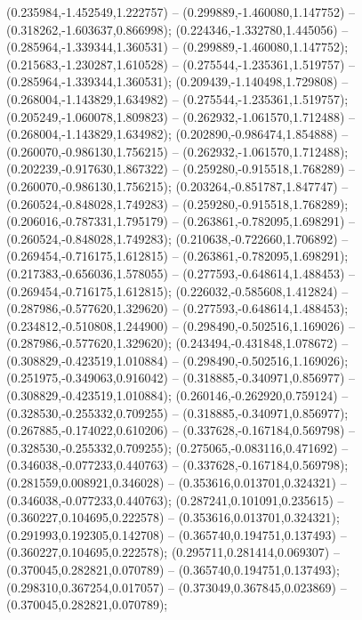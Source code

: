  (0.235984,-1.452549,1.222757) -- (0.299889,-1.460080,1.147752) -- (0.318262,-1.603637,0.866998);
 (0.224346,-1.332780,1.445056) -- (0.285964,-1.339344,1.360531) -- (0.299889,-1.460080,1.147752);
 (0.215683,-1.230287,1.610528) -- (0.275544,-1.235361,1.519757) -- (0.285964,-1.339344,1.360531);
 (0.209439,-1.140498,1.729808) -- (0.268004,-1.143829,1.634982) -- (0.275544,-1.235361,1.519757);
 (0.205249,-1.060078,1.809823) -- (0.262932,-1.061570,1.712488) -- (0.268004,-1.143829,1.634982);
 (0.202890,-0.986474,1.854888) -- (0.260070,-0.986130,1.756215) -- (0.262932,-1.061570,1.712488);
 (0.202239,-0.917630,1.867322) -- (0.259280,-0.915518,1.768289) -- (0.260070,-0.986130,1.756215);
 (0.203264,-0.851787,1.847747) -- (0.260524,-0.848028,1.749283) -- (0.259280,-0.915518,1.768289);
 (0.206016,-0.787331,1.795179) -- (0.263861,-0.782095,1.698291) -- (0.260524,-0.848028,1.749283);
 (0.210638,-0.722660,1.706892) -- (0.269454,-0.716175,1.612815) -- (0.263861,-0.782095,1.698291);
 (0.217383,-0.656036,1.578055) -- (0.277593,-0.648614,1.488453) -- (0.269454,-0.716175,1.612815);
 (0.226032,-0.585608,1.412824) -- (0.287986,-0.577620,1.329620) -- (0.277593,-0.648614,1.488453);
 (0.234812,-0.510808,1.244900) -- (0.298490,-0.502516,1.169026) -- (0.287986,-0.577620,1.329620);
 (0.243494,-0.431848,1.078672) -- (0.308829,-0.423519,1.010884) -- (0.298490,-0.502516,1.169026);
 (0.251975,-0.349063,0.916042) -- (0.318885,-0.340971,0.856977) -- (0.308829,-0.423519,1.010884);
 (0.260146,-0.262920,0.759124) -- (0.328530,-0.255332,0.709255) -- (0.318885,-0.340971,0.856977);
 (0.267885,-0.174022,0.610206) -- (0.337628,-0.167184,0.569798) -- (0.328530,-0.255332,0.709255);
 (0.275065,-0.083116,0.471692) -- (0.346038,-0.077233,0.440763) -- (0.337628,-0.167184,0.569798);
 (0.281559,0.008921,0.346028) -- (0.353616,0.013701,0.324321) -- (0.346038,-0.077233,0.440763);
 (0.287241,0.101091,0.235615) -- (0.360227,0.104695,0.222578) -- (0.353616,0.013701,0.324321);
 (0.291993,0.192305,0.142708) -- (0.365740,0.194751,0.137493) -- (0.360227,0.104695,0.222578);
 (0.295711,0.281414,0.069307) -- (0.370045,0.282821,0.070789) -- (0.365740,0.194751,0.137493);
 (0.298310,0.367254,0.017057) -- (0.373049,0.367845,0.023869) -- (0.370045,0.282821,0.070789);
